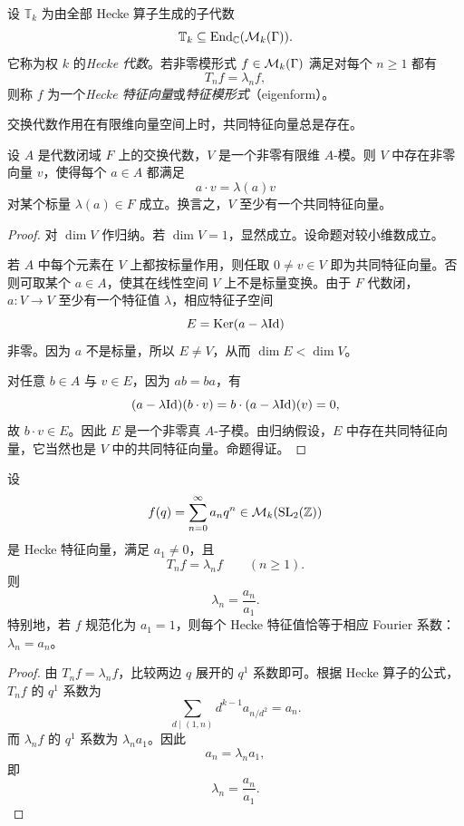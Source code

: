 \begin{definition}
设 $\mathbb{T}_k$ 为由全部 Hecke 算子生成的子代数
\[
\mathbb{T}_k\subseteq \mathrm{End}_{\mathbb{C}}(\mathcal{M}_k(\Gamma)).
\]
它称为权 $k$ 的\emph{Hecke 代数}。若非零模形式 $f\in \mathcal{M}_k(\Gamma)$ 满足对每个 $n\ge 1$ 都有
\[
T_nf=\lambda_n f,
\]
则称 $f$ 为一个\emph{Hecke 特征向量}或\emph{特征模形式}（eigenform）。
\end{definition}

交换代数作用在有限维向量空间上时，共同特征向量总是存在。

\begin{proposition}
设 $A$ 是代数闭域 $F$ 上的交换代数，$V$ 是一个非零有限维 $A$-模。则 $V$ 中存在非零向量 $v$，使得每个 $a\in A$ 都满足
\[
a\cdot v=\lambda(a)v
\]
对某个标量 $\lambda(a)\in F$ 成立。换言之，$V$ 至少有一个共同特征向量。
\end{proposition}

\begin{proof}
对 $\dim V$ 作归纳。若 $\dim V=1$，显然成立。设命题对较小维数成立。

若 $A$ 中每个元素在 $V$ 上都按标量作用，则任取 $0\neq v\in V$ 即为共同特征向量。否则可取某个 $a\in A$，使其在线性空间 $V$ 上不是标量变换。由于 $F$ 代数闭，$a:V\to V$ 至少有一个特征值 $\lambda$，相应特征子空间
\[
E=\mathrm{Ker}(a-\lambda\mathrm{Id})
\]
非零。因为 $a$ 不是标量，所以 $E\neq V$，从而 $\dim E<\dim V$。

对任意 $b\in A$ 与 $v\in E$，因为 $ab=ba$，有
\[
(a-\lambda\mathrm{Id})(b\cdot v)=b\cdot (a-\lambda\mathrm{Id})(v)=0,
\]
故 $b\cdot v\in E$。因此 $E$ 是一个非零真 $A$-子模。由归纳假设，$E$ 中存在共同特征向量，它当然也是 $V$ 中的共同特征向量。命题得证。
\end{proof}

\begin{proposition}
设
\[
f(q)=\sum_{n=0}^{\infty}a_nq^n\in \mathcal{M}_k(\mathrm{SL}_2(\mathbb{Z}))
\]
是 Hecke 特征向量，满足 $a_1\neq 0$，且
\[
T_nf=\lambda_n f\qquad (n\ge 1).
\]
则
\[
\lambda_n=\frac{a_n}{a_1}.
\]
特别地，若 $f$ 规范化为 $a_1=1$，则每个 Hecke 特征值恰等于相应 Fourier 系数：$\lambda_n=a_n$。
\end{proposition}

\begin{proof}
由 $T_nf=\lambda_nf$，比较两边 $q$ 展开的 $q^1$ 系数即可。根据 Hecke 算子的公式，$T_nf$ 的 $q^1$ 系数为
\[
\sum_{d\mid (1,n)}d^{k-1}a_{n/d^2}=a_n.
\]
而 $\lambda_nf$ 的 $q^1$ 系数为 $\lambda_n a_1$。因此
\[
a_n=\lambda_n a_1,
\]
即
\[
\lambda_n=\frac{a_n}{a_1}.
\]
\end{proof}

